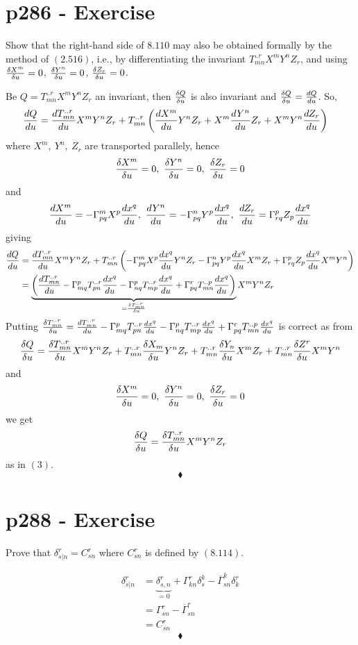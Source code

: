 \section{p286 - Exercise}
\begin{tcolorbox}
Show that the right-hand side of $\mathbf{8.110}$ may also be obtained formally by the method of $\mathbf{(2.516)}$, i.e., by differentiating the invariant $T^{..r}_{mn}X^mY^nZ_r$, and using $\fdv{X^m}{u}=0$, $\fdv{Y^n}{u}=0$, $\fdv{Z_r}{u}=0$.
\end{tcolorbox}
Be $Q= T^{..r}_{mn}X^mY^nZ_r$ an invariant, then $\fdv{Q}{u}$ is also invariant and $\fdv{Q}{u} = \dv{Q}{u}$.
So,
\begin{align}
\dv{Q}{u}&= \dv{T^{..r}_{mn}}{u}X^mY^nZ_r+ T^{..r}_{mn}\left(\dv{X^m}{u}Y^nZ_r+X^m\dv{Y^n}{u}Z_r +X^mY^n\dv{Z_r}{u}\right)
\end{align}
where $X^m, \ Y^n, \ Z_r$ are transported parallely, hence  $$\fdv{X^m}{u} = 0, \ \fdv{Y^n}{u}=0 , \ \fdv{Z_r}{u}=0  $$
and 
$$\dv{X^m}{u} = -\Gamma^m_{pq}X^p\dv{x^q}{u}, \ \dv{Y^n}{u}=-\Gamma^n_{pq}Y^p\dv{x^q}{u} , \ \dv{Z_r}{u}=\Gamma^p_{rq}Z_p\dv{x^q}{u}  $$
giving
\begin{align}
\dv{Q}{u} &= \dv{T^{..r}_{mn}}{u}X^mY^nZ_r+ T^{..r}_{mn}\left(-\Gamma^m_{pq}X^p\dv{x^q}{u}Y^nZ_r  -\Gamma^n_{pq}Y^p\dv{x^q}{u}X^mZ_r+\Gamma^p_{rq}Z_p\dv{x^q}{u}X^mY^n\right)\\
&= \underbrace{\left(\dv{T^{..r}_{mn}}{u}-\Gamma^p_{mq}T^{..r}_{pn}\dv{x^q}{u} -\Gamma^p_{nq}T^{..r}_{mp}\dv{x^q}{u}+\Gamma^r_{pq}T^{..p}_{mn}\dv{x^q}{u}\right)}_{= \fdv{T^{..r}_{mn}}{u}}X^mY^nZ_r
\end{align}
Putting $   \fdv{T^{..r}_{mn}}{u} = \dv{T^{..r}_{mn}}{u}-\Gamma^p_{mq}T^{..r}_{pn}\dv{x^q}{u} -\Gamma^p_{nq}T^{..r}_{mp}\dv{x^q}{u}+\Gamma^r_{pq}T^{..p}_{mn}\dv{x^q}{u}$ is correct as from $$\fdv{Q}{u}= \fdv{T^{..r}_{mn}}{u}X^mY^nZ_r+ T^{..r}_{mn}\fdv{X_m}{u}Y^nZ_r+T^{..r}_{mn}\fdv{Y_{n}}{u}X^mZ_r+T^{..r}_{mn}\fdv{Z^{r}}{u}X^mY^n$$ and 
$$\fdv{X^m}{u} = 0, \ \fdv{Y^n}{u}=0 , \ \fdv{Z_r}{u}=0  $$
we get 
$$\fdv{Q}{u}= \fdv{T^{..r}_{mn}}{u}X^mY^nZ_r$$
as in $(3)$.  
$$\blacklozenge$$
\newpage




\section{p288 - Exercise}
\begin{tcolorbox}
Prove that $\delta^r_{s|n} = C^r_{sn}$ where $C^r_{sn}$ is defined by $\mathbf{(8.114)}$.
\end{tcolorbox}
\begin{align}
 \delta^r_{s|n} &=\underbrace{\delta^r_{s,n} }_{=0}+ \Gamma^r_{kn}\delta^k_s - \overline{\Gamma}^k_{sn}\delta^r_k\\
 &=\Gamma^r_{sn} - \overline{\Gamma}^r_{sn}\\
 &= C^r_{sn}
\end{align}
$$\blacklozenge$$
\\\\
